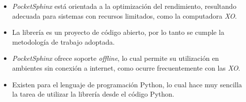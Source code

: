 \begin{itemize}
    \item \emph{PocketSphinx} est\'a orientada a la optimizaci\'on del rendimiento, resultando adecuada 
    para sistemas con recursos limitados, como la computadora \emph{XO}.
    \item La librer\'ia es un proyecto de c\'odigo abierto, por lo tanto se cumple la metodolog\'ia 
    de trabajo adoptada.
    \item \emph{PocketSphinx} ofrece soporte \emph{offline}, lo cual permite su utilizaci\'on en ambientes
    sin conexi\'on a internet, como ocurre frecuentemente con las \emph{XO}.
    \item Existen  para el lenguaje de programaci\'on Python, lo cual hace muy 
    sencilla la tarea de utilizar la librer\'ia desde el c\'odigo Python.
\end{itemize}
